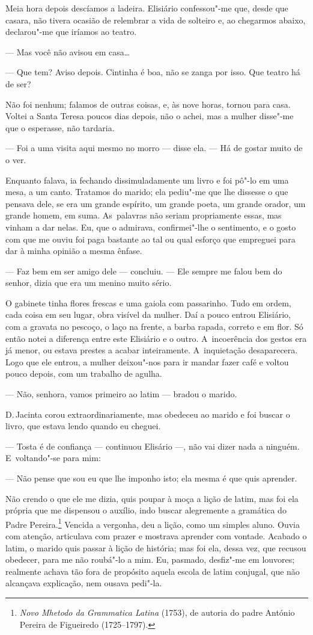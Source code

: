 \begin{linenumbers}
Meia hora depois descíamos a ladeira. Elisiário confessou"-me que, desde
que casara, não tivera ocasião de relembrar a vida de solteiro e, ao
chegarmos abaixo, declarou"-me que iríamos ao teatro.

--- Mas você não avisou em casa\ldots{}

--- Que tem? Aviso depois. Cintinha é boa, não se zanga por isso. Que
teatro há de ser?

Não foi nenhum; falamos de outras coisas, e, às nove horas, tornou para
casa. Voltei a Santa Teresa poucos dias depois, não o achei, mas a
mulher disse"-me que o esperasse, não tardaria.

--- Foi a uma visita aqui mesmo no morro --- disse ela. --- Há de gostar
muito de o ver.

Enquanto falava, ia fechando dissimuladamente um livro e foi pô"-lo em
uma mesa, a um canto. Tratamos do marido; ela pediu"-me que lhe dissesse
o que pensava dele, se era um grande espírito, um grande poeta, um
grande orador, um grande homem, em suma. As~palavras não seriam
propriamente essas, mas vinham a dar nelas. Eu, que o admirava,
confirmei"-lhe o sentimento, e o gosto com que me ouviu foi paga bastante
ao tal ou qual esforço que empreguei para dar à minha opinião a mesma
ênfase.

--- Faz bem em ser amigo dele --- concluiu. --- Ele sempre me falou bem do
senhor, dizia que era um menino muito sério.

O gabinete tinha flores frescas e uma gaiola com passarinho. Tudo em
ordem, cada coisa em seu lugar, obra visível da mulher. Daí a pouco
entrou Elisiário, com a gravata no pescoço, o laço na frente, a barba
rapada, correto e em flor. Só então notei a diferença entre este
Elisiário e o outro. A~incoerência dos gestos era já menor, ou estava
prestes a acabar inteiramente. A~inquietação desaparecera. Logo que ele
entrou, a mulher deixou"-nos para ir mandar fazer café e voltou pouco
depois, com um trabalho de agulha.

--- Não, senhora, vamos primeiro ao latim --- bradou o marido.

D.\,Jacinta corou extraordinariamente, mas obedeceu ao marido e foi
buscar o livro, que estava lendo quando eu cheguei.

--- Tosta é de confiança --- continuou Elisário ---, não vai dizer nada a
ninguém. E~voltando"-se para mim:

--- Não pense que sou eu que lhe imponho isto; ela mesma é que quis
aprender.

Não crendo o que ele me dizia, quis poupar à moça a lição de latim, mas
foi ela própria que me dispensou o auxílio, indo buscar alegremente a
gramática do Padre Pereira.\footnote{\emph{Novo Mhetodo da Grammatica
  Latina} (1753), de autoria do padre António Pereira de Figueiredo
  (1725--1797).} Vencida a vergonha, deu a lição, como um simples aluno.
Ouvia com atenção, articulava com prazer e mostrava aprender com
vontade. Acabado o latim, o marido quis passar à lição de história; mas
foi ela, dessa vez, que recusou obedecer, para me não roubá"-lo a mim.
Eu, pasmado, desfiz"-me em louvores; realmente achava tão fora de
propósito aquela escola de latim conjugal, que não alcançava explicação,
nem ousava pedi"-la.


\end{linenumbers}
